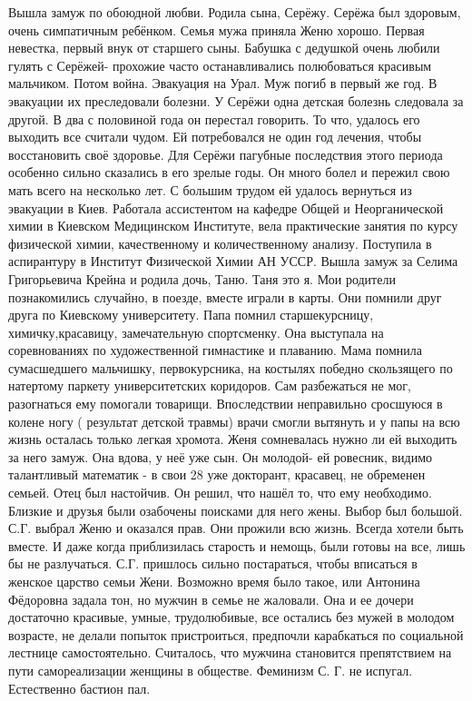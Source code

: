 Вышла замуж по обоюдной любви. Родила сына, Серёжу. Серёжа был здоровым, очень симпатичным ребёнком. Семья мужа приняла Женю хорошо. Первая невестка, первый внук от старшего сыны. Бабушка с дедушкой очень любили гулять с Серёжей- прохожие часто останавливались полюбоваться красивым мальчиком. Потом война. Эвакуация на Урал. Муж погиб в первый же год. В эвакуации их преследовали болезни. У Серёжи одна детская болезнь следовала за другой. В два с половиной года он перестал говорить. То что, удалось его выходить все считали чудом. Ей потребовался не один год лечения, чтобы восстановить своё здоровье. Для Серёжи пагубные последствия этого периода особенно сильно сказались в его зрелые годы. Он много болел и пережил свою мать всего на несколько лет.
С большим трудом ей удалось вернуться из эвакуации в Киев. Работала ассистентом на кафедре Общей и Неорганической химии в Киевском Медицинском Институте, вела практические занятия по курсу физической химии, качественному и количественному анализу. Поступила в аспирантуру в Институт Физической Химии АН УССР.
Вышла замуж за Селима Григорьевича Крейна и родила дочь, Таню. Таня это я. Мои родители познакомились случайно, в поезде, вместе играли в карты. Они помнили друг друга по Киевскому университету. Папа помнил старшекурсницу, химичку,красавицу, замечательную спортсменку. Она выступала на соревнованиях по художественной гимнастике и плаванию. Мама помнила сумасшедшего мальчишку, первокурсника, на костылях победно скользящего по натертому паркету университетских коридоров. Сам разбежаться не мог, разогнаться ему помогали товарищи. Впоследствии неправильно сросшуюся в колене ногу ( результат детской травмы) врачи смогли вытянуть и у папы на всю жизнь осталась только легкая хромота.
Женя сомневалась нужно ли ей выходить за него замуж. Она вдова, у неё уже сын. Он молодой- ей ровесник, видимо талантливый математик - в свои 28 уже докторант, красавец, не обременен семьей. Отец был настойчив. Он решил, что нашёл то, что ему необходимо. Близкие и друзья были озабочены поисками для него жены. Выбор был большой. С.Г. выбрал Женю и оказался прав. Они прожили всю жизнь. Всегда хотели быть вместе. И даже когда приблизилась старость и немощь, были готовы на все, лишь бы не разлучаться.
С.Г. пришлось сильно постараться, чтобы вписаться в женское царство семьи Жени. Возможно время было такое, или Антонина Фёдоровна задала тон, но мужчин в семье не жаловали. Она и ее дочери достаточно красивые, умные, трудолюбивые, все остались без мужей в молодом возрасте, не делали попыток пристроиться, предпочли карабкаться по социальной лестнице самостоятельно. Считалось, что мужчина становится препятствием на пути самореализации женщины в обществе. Феминизм С. Г. не испугал. Естественно бастион пал.
